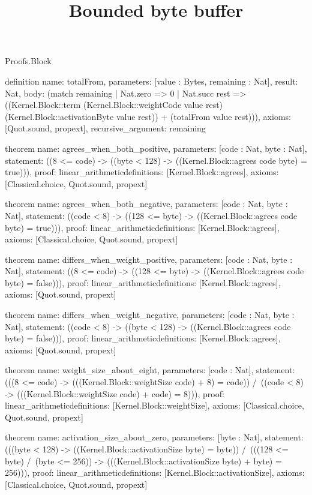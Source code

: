 \begin{lexlean}{Proofs.Block}
\title{Bounded byte buffer}
\begin{semanticmodule}
definition{
  name: totalFrom,
  parameters: [value : Bytes, remaining : Nat],
  result: Nat,
  body: (match remaining
    | Nat.zero => 0
    | Nat.succ rest => ((Kernel.Block::term (Kernel.Block::weightCode value rest) (Kernel.Block::activationByte value rest)) + (totalFrom value rest))),
  axioms: [Quot.sound, propext],
  recursive_argument: remaining
}

theorem{
  name: agrees_when_both_positive,
  parameters: [code : Nat, byte : Nat],
  statement: ((8 <= code) -> ((byte < 128) -> ((Kernel.Block::agrees code byte) = true))),
  proof: linear_arithmetic{definitions: [Kernel.Block::agrees]},
  axioms: [Classical.choice, Quot.sound, propext]
}

theorem{
  name: agrees_when_both_negative,
  parameters: [code : Nat, byte : Nat],
  statement: ((code < 8) -> ((128 <= byte) -> ((Kernel.Block::agrees code byte) = true))),
  proof: linear_arithmetic{definitions: [Kernel.Block::agrees]},
  axioms: [Classical.choice, Quot.sound, propext]
}

theorem{
  name: differs_when_weight_positive,
  parameters: [code : Nat, byte : Nat],
  statement: ((8 <= code) -> ((128 <= byte) -> ((Kernel.Block::agrees code byte) = false))),
  proof: linear_arithmetic{definitions: [Kernel.Block::agrees]},
  axioms: [Quot.sound, propext]
}

theorem{
  name: differs_when_weight_negative,
  parameters: [code : Nat, byte : Nat],
  statement: ((code < 8) -> ((byte < 128) -> ((Kernel.Block::agrees code byte) = false))),
  proof: linear_arithmetic{definitions: [Kernel.Block::agrees]},
  axioms: [Quot.sound, propext]
}

theorem{
  name: weight_size_about_eight,
  parameters: [code : Nat],
  statement: (((8 <= code) -> (((Kernel.Block::weightSize code) + 8) = code)) /\ ((code < 8) -> (((Kernel.Block::weightSize code) + code) = 8))),
  proof: linear_arithmetic{definitions: [Kernel.Block::weightSize]},
  axioms: [Classical.choice, Quot.sound, propext]
}

theorem{
  name: activation_size_about_zero,
  parameters: [byte : Nat],
  statement: (((byte < 128) -> ((Kernel.Block::activationSize byte) = byte)) /\ (((128 <= byte) /\ (byte <= 256)) -> (((Kernel.Block::activationSize byte) + byte) = 256))),
  proof: linear_arithmetic{definitions: [Kernel.Block::activationSize]},
  axioms: [Classical.choice, Quot.sound, propext]
}


\end{semanticmodule}
\end{lexlean}
